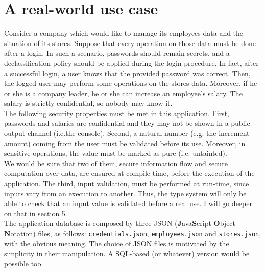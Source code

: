 \section{A real-world use case}\label{sec:example}
Consider a company which would like to manage its employees data and the situation of its stores. Suppose that every operation on those data must be done after a login. In such a scenario, passwords should remain secrets, and a declassification policy should be applied during the login procedure. In fact, after a successful login, a user knows that the provided password was correct. Then, the logged user may perform some operations on the stores data. Moreover, if he or she is a company leader, he or she can increase an employee's salary. The salary is strictly confidential, so nobody may know it. \\
The following security properties must be met in this application. First, passwords and salaries are confidential and they may not be shown in a public output channel (i.e.the console). Second, a natural number (e.g. the increment amount) coming from the user must be validated before its use. Moreover, in sensitive operations, the value must be marked as pure (i.e. untainted). \\
We would be sure that two of them, secure information flow and secure computation over data, are ensured at compile time, before the execution of the application. The third, input validation, must be performed at run-time, since inputs vary from an execution to another. Thus, the type system will only be able to check that an input value is validated before a real use. I will go deeper on that in section 5. \\
The application database is composed by three JSON (\textbf{J}ava\textbf{S}cript \textbf{O}bject \textbf{N}otation) files, as follows: \texttt{credentials.json}, \texttt{employees.json} and \texttt{stores.json}, with the obvious meaning. The choice of JSON files is motivated by the simplicity in their manipulation. A SQL-based (or whatever) version would be possible too.
